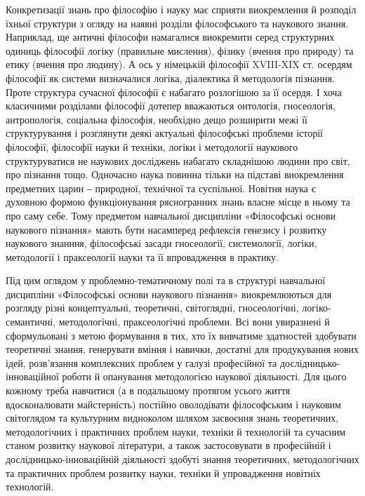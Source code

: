 Конкретизації знань про філософію і науку має сприяти виокремлення й
розподіл їхньої структури з огляду на наявні розділи філософського та
наукового знання. Наприклад, ще античні філософи намагалися виокремити
серед структурних одиниць філософії логіку (правильне мислення), фізику
(вчення про природу) та етику (вчення про людину). А ось у німецькій
філософії XVIII-XIX ст. осердям філософії як системи визначалися логіка,
діалектика й методологія пізнання. Проте структура сучасної філософії є
набагато розлогішою за її осердя. І хоча класичними розділами філософії
дотепер вважаються онтологія, гносеологія, антропологія, соціальна філософія,
необхідно дещо розширити межі її структурування і розглянути деякі актуальні
філософські проблеми історії філософії, філософії науки й техніки, логіки і
методології наукового структуруватися не наукових досліджень набагато складнішою
людини про світ, про пізнання тощо. Одночасно наука повинна
тільки на підставі виокремлення предметних царин
‒ природної, технічної та суспільної. Новітня наука є
духовною формою функціонування рясногранних знань
власне місце в ньому та про саму себе. Тому предметом
навчальної дисципліни «Філософські основи наукового пізнання» мають бути
насамперед рефлексія генезису і розвитку наукового знанння, філософські
засади гносеології, системології, логіки, методології і праксеології науки та її
впровадження в практику.

Під цим оглядом у проблемно-тематичному полі та в структурі навчальної
дисципліни «Філософські основи наукового пізнання» виокремлюються для
розгляду різні концептуальні, теоретичні, світоглядні, гносеологічні, логіко-
семантичні, методологічні, праксеологічні проблеми. Всі вони увиразнені й
сформульовані з метою формування в тих, хто їх вивчатиме здатностей
здобувати теоретичні знання, генерувати вміння і навички, достатні для
продукування нових ідей, розв’язання комплексних проблем у галузі
професійної та дослідницько-інноваційної роботи й опанування методологією
наукової діяльності. Для цього кожному треба навчитися (а в подальшому
протягом усього життя вдосконалювати майстерність) постійно оволодівати
філософським і науковим світоглядом та культурним видноколом шляхом
засвоєння знань теоретичних, методологічних і практичних проблем науки,
техніки й технологій та сучасним станом розвитку наукової літератури, а також
застосовувати в професійній і дослідницько-інноваційній діяльності здобуті
знання теоретичних, методологічних та практичних проблем розвитку науки,
техніки й упровадження новітніх технологій.

